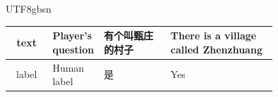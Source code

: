 \begin{table}[h!]
\begin{CJK*}{UTF8}{gbsn}
{\begin{tabular}{|c|>{\centering\arraybackslash}p{0.1\linewidth}|>{\centering\arraybackslash}p{0.25\linewidth}|>{\centering\arraybackslash}p{0.4\linewidth}|}
    text & Player's question & 有个叫甄庄的村子 & There is a village called Zhenzhuang \\ \hline 
    label & Human label & 是 & Yes \\ \hline 
    \end{tabular}
    }
    \end{CJK*}
\end{table}
